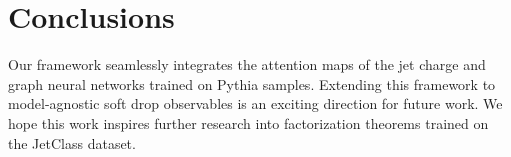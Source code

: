 \section{Conclusions}\label{sec:conclusions}

Our framework seamlessly integrates the attention maps of the jet charge
and graph neural networks trained on Pythia samples. Extending this
framework to model-agnostic soft drop observables is an exciting
direction for future work. We hope this work inspires further research
into factorization theorems trained on the JetClass dataset.

